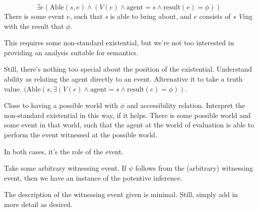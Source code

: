 \begin{note}
  \[\exists e(\text{Able}(s,e) \land (V(e) \land \text{agent} = s \land \text{result}(e) = \phi))\]
  There is some event \(e\), such that \emph{s} is able to bring about, and \(e\) consists of \emph{s} \emph{V}ing with the result that \(\phi\).

  This requires some non-standard existential, but we're not too interested in providing an analysis suitable for semantics.

  Still, there's nothing too special about the position of the existential.
  Understand ability as relating the agent directly to an event.
  Alternative it to take a truth value.
  \((\text{Able}(s,\exists (V(e) \land \text{agent} = s \land \text{result}(e) = \phi))\).

  Close to having a possible world with \(\phi\) and accessibility relation.
  Interpret the non-standard existential in this way, if it helps.
  There is some possible world and some event in that world, such that the agent at the world of evaluation is able to perform the event witnessed at the possible world.

  In both cases, it's the role of the event.


  Take some arbitrary witnessing event.
  If \(\psi\) follows from the (arbitrary) witnessing event, then we have an instance of the potentive inference.
\end{note}

\begin{note}
  The description of the witnessing event given is minimal.
  Still, simply add in more detail as desired.
\end{note}

